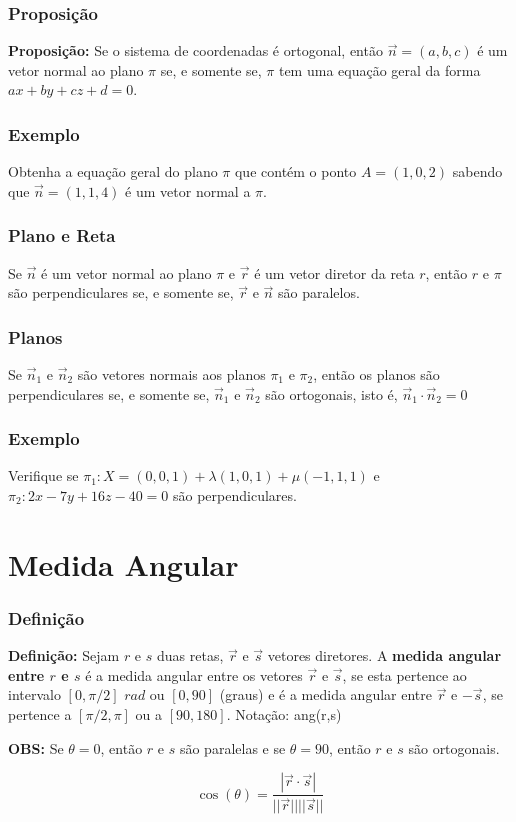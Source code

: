\documentclass[hyperref={pdfpagelabels=false}]{beamer}
\begin{document}
\begin{frame}
\frametitle{Proposição}

{\bf Proposição: } Se o sistema de coordenadas é ortogonal, então $\overrightarrow{n} = (a,b,c)$ é um vetor normal ao plano $\pi$ se, e somente se, $\pi$ tem uma equação geral da forma $ax + by + cz + d = 0$.

\end{frame}

\begin{frame}
\frametitle{Exemplo}

Obtenha a equação geral do plano $\pi$ que contém o ponto $A = (1,0,2)$ sabendo que $\overrightarrow{n} = (1,1,4)$ é um vetor normal a $\pi$.

\end{frame}


\begin{frame}
\frametitle{Plano e Reta}

Se $\overrightarrow{n}$ é um vetor normal ao plano $\pi$ e $\overrightarrow{r}$ é um vetor diretor da reta $r$, então $r$ e $\pi$ são perpendiculares se, e somente se, $\overrightarrow{r}$ e $\overrightarrow{n}$ são paralelos.
\end{frame}

\begin{frame}
\frametitle{Planos}

Se $\overrightarrow{n}_1$ e $\overrightarrow{n}_2$ são vetores normais aos planos $\pi_1$ e $\pi_2$, então os planos são perpendiculares se, e somente se, $\overrightarrow{n}_1$ e $\overrightarrow{n}_2$ são ortogonais, isto é, $\overrightarrow{n}_1 \cdot \overrightarrow{n}_2 = 0$

\end{frame}

\begin{frame}
\frametitle{Exemplo} 

Verifique se $\pi_1:X = (0,0,1) + \lambda(1,0,1) + \mu(-1,1,1)$ e $\pi_2: 2x - 7y + 16z -40=0$ são perpendiculares.

\end{frame}

\section{Medida Angular}

\begin{frame}
\frametitle{Definição}

{\bf Definição:} Sejam $r$ e $s$ duas retas, $\overrightarrow{r}$ e $\overrightarrow{s}$ vetores diretores. A {\bf medida angular entre $r$ e $s$} é a medida angular entre os vetores $\overrightarrow{r}$ e $\overrightarrow{s}$, se esta pertence ao intervalo $[0,\pi/2]$ $rad$ ou $[0,90]$ (graus) e é a medida angular entre $\overrightarrow{r}$ e $ - \overrightarrow{s}$, se pertence a $[\pi/2,\pi]$ ou a $[90,180]$. Notação: ang(r,s)

{\bf OBS:} Se $\theta = 0$, então $r$ e $s$ são paralelas e se $\theta = 90$, então $r$ e $s$ são ortogonais.
\pause

$$\cos(\theta) = \frac{|\overrightarrow{r} \cdot \overrightarrow{s}|}{||\overrightarrow{r}||||\overrightarrow{s}||}$$
\end{frame}
\end{document}
